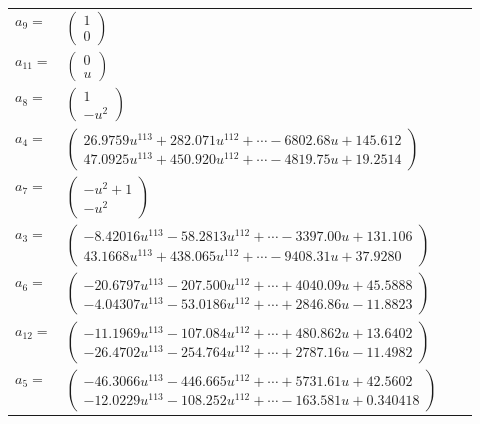 \documentclass[1p]{elsarticle_modified}
\theoremstyle{definition}
\begin{document}
\begin{tabular}{m{7pt} m{180pt} m{7pt} m{180pt} }
\flushright $a_{9}=$&$\begin{pmatrix}1\\0\end{pmatrix}$ \\
\flushright $a_{11}=$&$\begin{pmatrix}0\\u\end{pmatrix}$ \\
\flushright $a_{8}=$&$\begin{pmatrix}1\\- u^2\end{pmatrix}$ \\
\flushright $a_{4}=$&$\begin{pmatrix}26.9759 u^{113}+282.071 u^{112}+\cdots-6802.68 u+145.612\\47.0925 u^{113}+450.920 u^{112}+\cdots-4819.75 u+19.2514\end{pmatrix}$ \\
\flushright $a_{7}=$&$\begin{pmatrix}- u^2+1\\- u^2\end{pmatrix}$ \\
\flushright $a_{3}=$&$\begin{pmatrix}-8.42016 u^{113}-58.2813 u^{112}+\cdots-3397.00 u+131.106\\43.1668 u^{113}+438.065 u^{112}+\cdots-9408.31 u+37.9280\end{pmatrix}$ \\
\flushright $a_{6}=$&$\begin{pmatrix}-20.6797 u^{113}-207.500 u^{112}+\cdots+4040.09 u+45.5888\\-4.04307 u^{113}-53.0186 u^{112}+\cdots+2846.86 u-11.8823\end{pmatrix}$ \\
\flushright $a_{12}=$&$\begin{pmatrix}-11.1969 u^{113}-107.084 u^{112}+\cdots+480.862 u+13.6402\\-26.4702 u^{113}-254.764 u^{112}+\cdots+2787.16 u-11.4982\end{pmatrix}$ \\
\flushright $a_{5}=$&$\begin{pmatrix}-46.3066 u^{113}-446.665 u^{112}+\cdots+5731.61 u+42.5602\\-12.0229 u^{113}-108.252 u^{112}+\cdots-163.581 u+0.340418\end{pmatrix}$ \\

\end{tabular}
\end{document}
